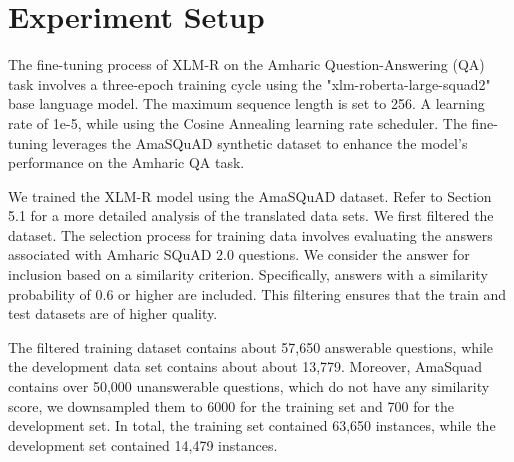 \section{Experiment Setup}
The fine-tuning process of XLM-R on the Amharic Question-Answering (QA) task involves a three-epoch training cycle using the "xlm-roberta-large-squad2" base language model. The maximum sequence length is set to 256. A learning rate of 1e-5, while using the Cosine Annealing learning rate scheduler. The fine-tuning leverages the AmaSQuAD synthetic dataset to enhance the model's performance on the Amharic QA task.

We trained the XLM-R model using the AmaSQuAD dataset. Refer to Section 5.1 for a more detailed analysis of the translated data sets. We first filtered the dataset. The selection process for training data involves evaluating the answers associated with Amharic SQuAD 2.0 questions. We consider the answer for inclusion based on a similarity criterion. Specifically, answers with a similarity probability of 0.6 or higher are included. This filtering ensures that the train and test datasets are of higher quality.

The filtered training dataset contains about 57,650 answerable questions, while the development data set contains about about 13,779. Moreover, AmaSquad contains over 50,000 unanswerable questions, which do not have any similarity score, we downsampled them to 6000 for the training set and 700 for the development set. In total, the training set contained 63,650 instances, while the development set contained 14,479 instances.
